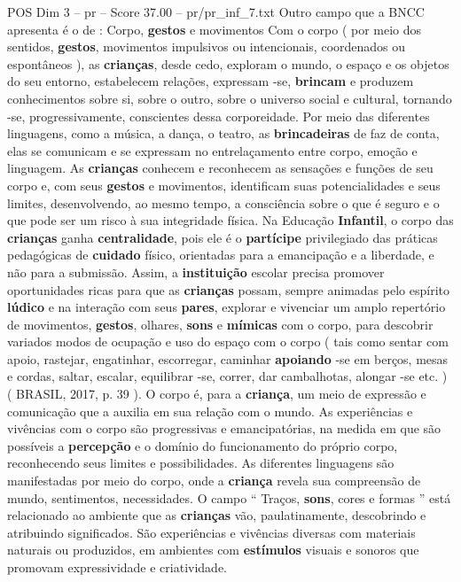 \begin{textsample}{POS Dim 3 – pr – Score 37.00 – pr/pr\_inf\_7.txt}
Outro campo que a BNCC apresenta é o de : Corpo, \textbf{gestos} e movimentos Com o corpo ( por meio dos sentidos, \textbf{gestos}, movimentos impulsivos ou intencionais, coordenados ou espontâneos ), as \textbf{crianças}, desde cedo, exploram o mundo, o espaço e os objetos do seu entorno, estabelecem relações, expressam -se, \textbf{brincam} e produzem conhecimentos sobre si, sobre o outro, sobre o universo social e cultural, tornando -se, progressivamente, conscientes dessa corporeidade.
Por meio das diferentes linguagens, como a música, a dança, o teatro, as \textbf{brincadeiras} de faz de conta, elas se comunicam e se expressam no entrelaçamento entre corpo, emoção e linguagem.
As \textbf{crianças} conhecem e reconhecem as sensações e funções de seu corpo e, com seus \textbf{gestos} e movimentos, identificam suas potencialidades e seus limites, desenvolvendo, ao mesmo tempo, a consciência sobre o que é seguro e o que pode ser um risco à sua integridade física.
Na Educação \textbf{Infantil}, o corpo das \textbf{crianças} ganha \textbf{centralidade}, pois ele é o \textbf{partícipe} privilegiado das práticas pedagógicas de \textbf{cuidado} físico, orientadas para a emancipação e a liberdade, e não para a submissão.
Assim, a \textbf{instituição} escolar precisa promover oportunidades ricas para que as \textbf{crianças} possam, sempre animadas pelo espírito \textbf{lúdico} e na interação com seus \textbf{pares}, explorar e vivenciar um amplo repertório de movimentos, \textbf{gestos}, olhares, \textbf{sons} e \textbf{mímicas} com o corpo, para descobrir variados modos de ocupação e uso do espaço com o corpo ( tais como sentar com apoio, rastejar, engatinhar, escorregar, caminhar \textbf{apoiando} -se em berços, mesas e cordas, saltar, escalar, equilibrar -se, correr, dar cambalhotas, alongar -se etc. ) ( BRASIL, 2017, p. 39 ).
O corpo é, para a \textbf{criança}, um meio de expressão e comunicação que a auxilia em sua relação com o mundo.
As experiências e vivências com o corpo são progressivas e emancipatórias, na medida em que são possíveis a \textbf{percepção} e o domínio do funcionamento do próprio corpo, reconhecendo seus limites e possibilidades.
As diferentes linguagens são manifestadas por meio do corpo, onde a \textbf{criança} revela sua compreensão de mundo, sentimentos, necessidades.
O campo “ Traços, \textbf{sons}, cores e formas ” está relacionado ao ambiente que as \textbf{crianças} vão, paulatinamente, descobrindo e atribuindo significados.
São experiências e vivências diversas com materiais naturais ou produzidos, em ambientes com \textbf{estímulos} visuais e sonoros que promovam expressividade e criatividade.

\end{textsample}
